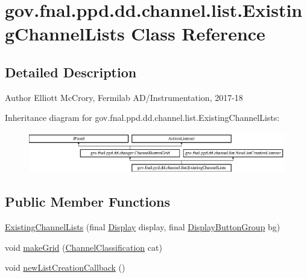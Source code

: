 \hypertarget{classgov_1_1fnal_1_1ppd_1_1dd_1_1channel_1_1list_1_1ExistingChannelLists}{\section{gov.\-fnal.\-ppd.\-dd.\-channel.\-list.\-Existing\-Channel\-Lists Class Reference}
\label{classgov_1_1fnal_1_1ppd_1_1dd_1_1channel_1_1list_1_1ExistingChannelLists}
}


\subsection{Detailed Description}
\begin{DoxyAuthor}{Author}
Elliott Mc\-Crory, Fermilab A\-D/\-Instrumentation, 2017-\/18 
\end{DoxyAuthor}
Inheritance diagram for gov.\-fnal.\-ppd.\-dd.\-channel.\-list.\-Existing\-Channel\-Lists\-:\begin{figure}[H]
\begin{center}
\leavevmode
\includegraphics[height=1.761006cm]{classgov_1_1fnal_1_1ppd_1_1dd_1_1channel_1_1list_1_1ExistingChannelLists}
\end{center}
\end{figure}
\subsection*{Public Member Functions}
\begin{DoxyCompactItemize}
\item 
\hyperlink{classgov_1_1fnal_1_1ppd_1_1dd_1_1channel_1_1list_1_1ExistingChannelLists_a70f446df6a0fcf3cea1e0d524aea2192}{Existing\-Channel\-Lists} (final \hyperlink{interfacegov_1_1fnal_1_1ppd_1_1dd_1_1signage_1_1Display}{Display} display, final \hyperlink{classgov_1_1fnal_1_1ppd_1_1dd_1_1util_1_1specific_1_1DisplayButtonGroup}{Display\-Button\-Group} bg)
\item 
void \hyperlink{classgov_1_1fnal_1_1ppd_1_1dd_1_1channel_1_1list_1_1ExistingChannelLists_affca544ad4b4775e0b36334e75595c77}{make\-Grid} (\hyperlink{classgov_1_1fnal_1_1ppd_1_1dd_1_1changer_1_1ChannelClassification}{Channel\-Classification} cat)
\item 
void \hyperlink{classgov_1_1fnal_1_1ppd_1_1dd_1_1channel_1_1list_1_1ExistingChannelLists_a1cedfe917a325659dfa082f83c9cef96}{new\-List\-Creation\-Callback} ()
\end{DoxyCompactItemize}
